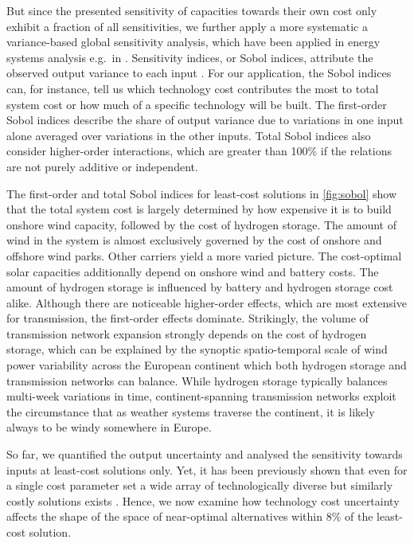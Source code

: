 But since the presented sensitivity of capacities towards their own cost only
exhibit a fraction of all sensitivities, we further apply a more systematic a
variance-based global sensitivity analysis, which have been applied in energy
systems analysis e.g.~in
\cite{trondle_trade-offs_2020,mavromatidis_uncertainty_2018}. Sensitivity
indices, or Sobol indices, attribute the observed output variance to each input
\cite{sudret_global_2008}. For our application, the Sobol indices can, for
instance, tell us which technology cost contributes the most to total system
cost or how much of a specific technology will be built. The first-order Sobol
indices describe the share of output variance due to variations in one input
alone averaged over variations in the other inputs. Total Sobol indices also
consider higher-order interactions, which are greater than 100\% if the
relations are not purely additive or independent.

The first-order and total Sobol indices for least-cost solutions in
\cref{fig:sobol} show that the total system cost is largely determined by how
expensive it is to build onshore wind capacity, followed by the cost of hydrogen
storage. The amount of wind in the system is almost exclusively governed by the
cost of onshore and offshore wind parks. Other carriers yield a more varied
picture. The cost-optimal solar capacities additionally depend on onshore wind
and battery costs. The amount of hydrogen storage is influenced by battery and
hydrogen storage cost alike. Although there are noticeable higher-order effects,
which are most extensive for transmission, the first-order effects dominate.
Strikingly, the volume of transmission network expansion strongly depends on the
cost of hydrogen storage, which can be explained by the synoptic spatio-temporal
scale of wind power variability across the European continent which both
hydrogen storage and transmission networks can balance. While hydrogen storage
typically balances multi-week variations in time, continent-spanning
transmission networks exploit the circumstance that as weather systems traverse
the continent, it is likely always to be windy somewhere in Europe.


So far, we quantified the output uncertainty and analysed the sensitivity
towards inputs at least-cost solutions only. Yet, it has been previously shown
that even for a single cost parameter set a wide array of technologically
diverse but similarly costly solutions exists \cite{nearoptimal}. Hence, we now
examine how technology cost uncertainty affects the shape of the space of
near-optimal alternatives within 8\% of the least-cost solution.

